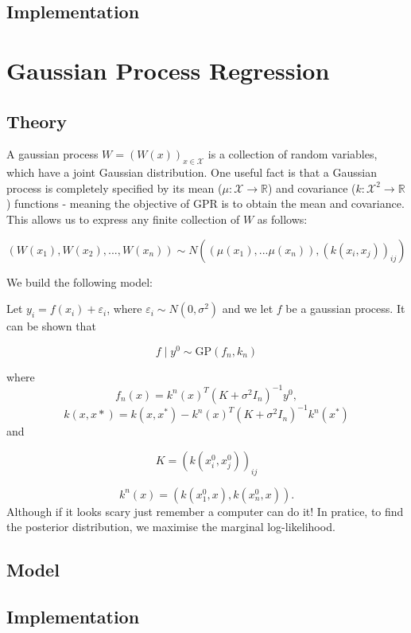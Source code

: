 \documentclass[
]{article}
\begin{document}
\hypertarget{implementation-1}{%
\subsection{Implementation}\label{implementation-1}}

\hypertarget{gaussian-process-regression}{%
\section{Gaussian Process
Regression}\label{gaussian-process-regression}}

\hypertarget{theory-2}{%
\subsection{Theory}\label{theory-2}}

A gaussian process \(W = (W(x))_{x \in \mathcal{X}}\) is a collection of
random variables, which have a joint Gaussian distribution. One useful
fact is that a Gaussian process is completely specified by its mean
(\(\mu:\mathcal{X} \rightarrow \mathbb{R}\)) and covariance
(\(k:\mathcal{X}^2 \rightarrow \mathbb{R}\)) functions - meaning the
objective of GPR is to obtain the mean and covariance. This allows us to
express any finite collection of \(W\) as follows:

\[
(W(x_1), W(x_2), ..., W(x_n)) \sim N((\mu(x_1),...\mu(x_n)), (k(x_i,x_j))_{ij})
\]

We build the following model:

Let \(y_i = f(x_i) + \varepsilon_i\), where
\(\varepsilon_i \sim N(0, \sigma^2)\) and we let \(f\) be a gaussian
process. It can be shown that

\[
f \mid y^0 \sim \text{GP}(f_n,k_n)
\]

where \[f_n(x) = k^n(x)^T(K + \sigma^2I_n)^{-1}y^0,\]
\[k(x,x*) = k(x, x^*) - k^n(x)^T (K + \sigma^2 I_n)^{-1} k^n(x^*)\] and

\[
K = (k(x_i^0,x_j^0))_{ij}
\]

\[
k^n(x) = (k(x_1^0,x),k(x_n^0,x)).
\] Although if it looks scary just remember a computer can do it! In
pratice, to find the posterior distribution, we maximise the marginal
log-likelihood.

\hypertarget{model-2}{%
\subsection{Model}\label{model-2}}

\hypertarget{implementation-2}{%
\subsection{Implementation}\label{implementation-2}}
\end{document}
